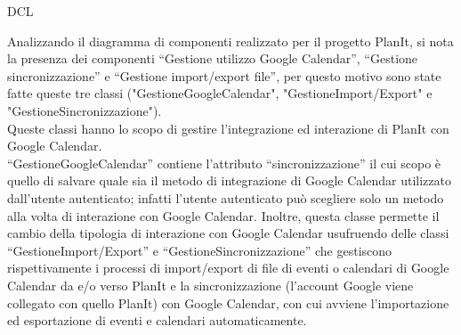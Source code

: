 \begin{listaPersonale}{DCL}
\begin{listaPersonale2}[DCL]{}
        Analizzando il diagramma di componenti realizzato per il progetto PlanIt, si nota la presenza dei componenti “Gestione utilizzo Google Calendar”, “Gestione sincronizzazione” e “Gestione import/export file”, per questo motivo sono state fatte queste tre classi ("GestioneGoogleCalendar", "GestioneImport/Export" e "GestioneSincronizzazione"). \\
        Queste classi hanno lo scopo di gestire l'integrazione ed interazione di PlanIt con Google Calendar. \\
        “GestioneGoogleCalendar” contiene l'attributo “sincronizzazione” il cui scopo è quello di salvare quale sia il metodo di integrazione di Google Calendar utilizzato dall'utente autenticato; infatti l'utente autenticato può scegliere solo un metodo alla volta di interazione con Google Calendar.
        Inoltre, questa classe permette il cambio della tipologia di interazione con Google Calendar usufruendo delle classi “GestioneImport/Export” e “GestioneSincronizzazione” che gestiscono rispettivamente i processi di import/export di file di eventi o calendari di Google Calendar da e/o verso PlanIt e la sincronizzazione (l'account Google viene collegato con quello PlanIt) con Google Calendar, con cui avviene l'importazione ed esportazione di eventi e calendari automaticamente.


        \begin{center}
            
        \end{center}
        \newpage



\end{listaPersonale2}
\end{listaPersonale}
